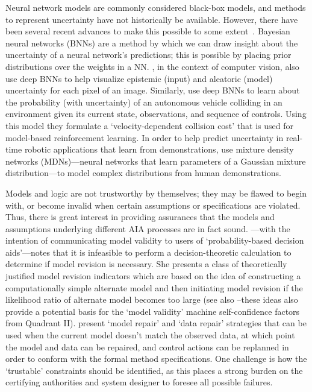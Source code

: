 Neural network models are commonly considered black-box models, and methods to represent uncertainty have not historically be available. However, there have been several recent advances to make this possible to some extent~\cite{Gal2016-om,Gal2016-eq}. Bayesian neural networks (BNNs) are a method by which we can draw insight about the uncertainty of a neural network's predictions; this is possible by placing prior distributions over the weights in a NN. \citet{Kendall2017-ry}, in the context of computer vision, also use deep BNNs to help visualize epistemic (input) and aleatoric (model) uncertainty for each pixel of an image. 
Similarly, \citet{Kahn2017-vy} use deep BNNs to learn about the probability (with uncertainty) of an autonomous vehicle colliding in an environment given its current state, observations, and sequence of controls. Using this model they formulate a `velocity-dependent collision cost' that is used for model-based reinforcement learning. 
In order to help predict uncertainty in real-time robotic applications that learn from demonstrations, \citet{Choi2017-th} use mixture density networks (MDNs)---neural networks that learn parameters of a Gaussian mixture distribution---to model complex distributions from human demonstrations.

Models and logic are not trustworthy by themselves; they may be flawed to begin with, or become invalid when certain assumptions or specifications are violated. Thus, there is great interest in providing assurances that the models and assumptions underlying different AIA processes are in fact sound. \citet{Laskey1991-mf}---with the intention of communicating model validity to users of `probability-based decision aids'---notes that it is infeasible to perform a decision-theoretic calculation to determine if model revision is necessary. She presents a class of theoretically justified model revision indicators which are based on the idea of constructing a computationally simple alternate model and then initiating model revision if the likelihood ratio of alternate model becomes too large (see also \citet{Zagorecki2015-qy,Habbema1976-xd} --these ideas also provide a potential basis for the `model validity' machine self-confidence factors from Quadrant II). \citet{Ghosh2016-dl}  present `model repair' and `data repair' strategies that can be used when the current model doesn't match the observed data, at which point the model and data can be repaired, and control actions can be replanned in order to conform with the formal method specifications. One challenge is how the `trustable' constraints should be identified, as this places a strong burden on the certifying authorities and system designer to foresee all possible failures.
